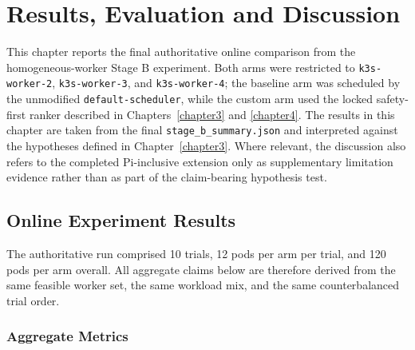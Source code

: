 \chapter{Results, Evaluation and Discussion}
\label{chapter5}

This chapter reports the final authoritative online comparison from the homogeneous-worker Stage B experiment. Both arms were restricted to \texttt{k3s-worker-2}, \texttt{k3s-worker-3}, and \texttt{k3s-worker-4}; the baseline arm was scheduled by the unmodified \texttt{default-scheduler}, while the custom arm used the locked safety-first ranker described in Chapters~\ref{chapter3} and \ref{chapter4}. The results in this chapter are taken from the final \texttt{stage\_b\_summary.json} and interpreted against the hypotheses defined in Chapter~\ref{chapter3}. Where relevant, the discussion also refers to the completed Pi-inclusive extension only as supplementary limitation evidence rather than as part of the claim-bearing hypothesis test.


\section{Online Experiment Results}
\label{sec:results}

The authoritative run comprised 10 trials, 12 pods per arm per trial, and 120 pods per arm overall. All aggregate claims below are therefore derived from the same feasible worker set, the same workload mix, and the same counterbalanced trial order.

\subsection{Aggregate Metrics}

